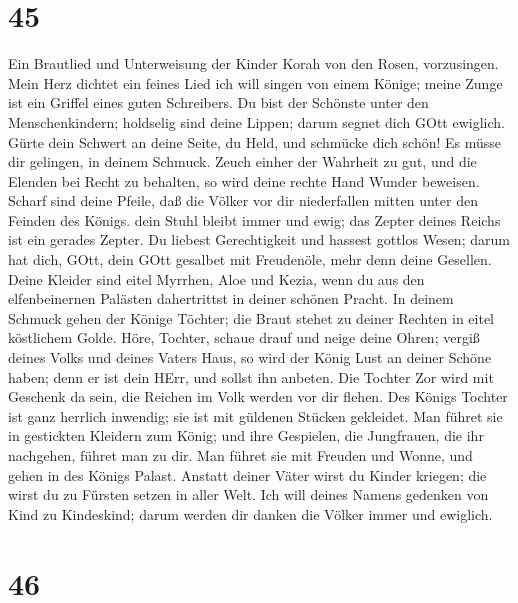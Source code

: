 \hypertarget{section-44}{%
\section{45}\label{section-44}}

 Ein Brautlied und Unterweisung der Kinder Korah von den
Rosen, vorzusingen.  Mein Herz dichtet ein feines Lied ich
will singen von einem Könige; meine Zunge ist ein Griffel eines guten
Schreibers.  Du bist der Schönste unter den Menschenkindern;
holdselig sind deine Lippen; darum segnet dich GOtt ewiglich.
 Gürte dein Schwert an deine Seite, du Held, und schmücke
dich schön!  Es müsse dir gelingen, in deinem Schmuck. Zeuch
einher der Wahrheit zu gut, und die Elenden bei Recht zu behalten, so
wird deine rechte Hand Wunder beweisen.  Scharf sind deine
Pfeile, daß die Völker vor dir niederfallen mitten unter den Feinden des
Königs.  dein Stuhl bleibt immer und ewig; das Zepter deines
Reichs ist ein gerades Zepter.  Du liebest Gerechtigkeit und
hassest gottlos Wesen; darum hat dich, GOtt, dein GOtt gesalbet mit
Freudenöle, mehr denn deine Gesellen.  Deine Kleider sind
eitel Myrrhen, Aloe und Kezia, wenn du aus den elfenbeinernen Palästen
dahertrittst in deiner schönen Pracht.  In deinem Schmuck
gehen der Könige Töchter; die Braut stehet zu deiner Rechten in eitel
köstlichem Golde.  Höre, Tochter, schaue drauf und neige
deine Ohren; vergiß deines Volks und deines Vaters Haus, 
so wird der König Lust an deiner Schöne haben; denn er ist dein HErr,
und sollst ihn anbeten.  Die Tochter Zor wird mit Geschenk
da sein, die Reichen im Volk werden vor dir flehen.  Des
Königs Tochter ist ganz herrlich inwendig; sie ist mit güldenen Stücken
gekleidet.  Man führet sie in gestickten Kleidern zum
König; und ihre Gespielen, die Jungfrauen, die ihr nachgehen, führet man
zu dir.  Man führet sie mit Freuden und Wonne, und gehen in
des Königs Palast.  Anstatt deiner Väter wirst du Kinder
kriegen; die wirst du zu Fürsten setzen in aller Welt.  Ich
will deines Namens gedenken von Kind zu Kindeskind; darum werden dir
danken die Völker immer und ewiglich.

\hypertarget{section-45}{%
\section{46}\label{section-45}}

